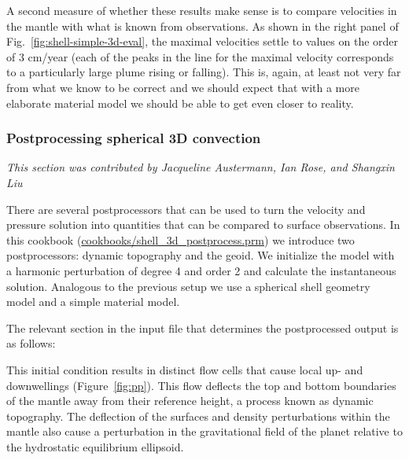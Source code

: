\documentclass{article}
\begin{document}
A second measure of whether these results make sense is to compare velocities in
the mantle with what is known from observations. As shown in the right panel of
Fig.~\ref{fig:shell-simple-3d-eval}, the maximal velocities settle to values on
the order of 3 cm/year (each of the peaks in the line for the maximal velocity
corresponds to a particularly large plume rising or falling). This is, again, at
least not very far from what we know to be correct and we should expect that
with a more elaborate material model we should be able to get even closer to
reality.

\subsubsection{Postprocessing spherical 3D convection}
\label{sec:cookbooks-shell_3d_postprocess.prm}
\textit{This section was contributed by Jacqueline Austermann, Ian Rose, and Shangxin Liu}


There are several postprocessors that can be used to turn the velocity
and pressure solution into quantities that can be compared to surface
observations. In this cookbook (\url{cookbooks/shell_3d_postprocess.prm})
we introduce two postprocessors: dynamic topography and the geoid.
We initialize the model with a harmonic
perturbation of degree 4 and order 2 and calculate the
instantaneous solution. Analogous to the previous setup we use a spherical
shell geometry model and a simple material model.

The relevant section in the input file that determines the postprocessed
output is as follows:



This initial condition results in distinct flow cells that cause local up- and
downwellings (Figure~\ref{fig:pp}). This flow deflects the top and bottom boundaries
of the mantle away from their reference height, a process known as dynamic topography.
The deflection of the surfaces and density perturbations within the mantle also
cause a perturbation in the gravitational field of the planet relative to the
hydrostatic equilibrium ellipsoid.
\end{document}
